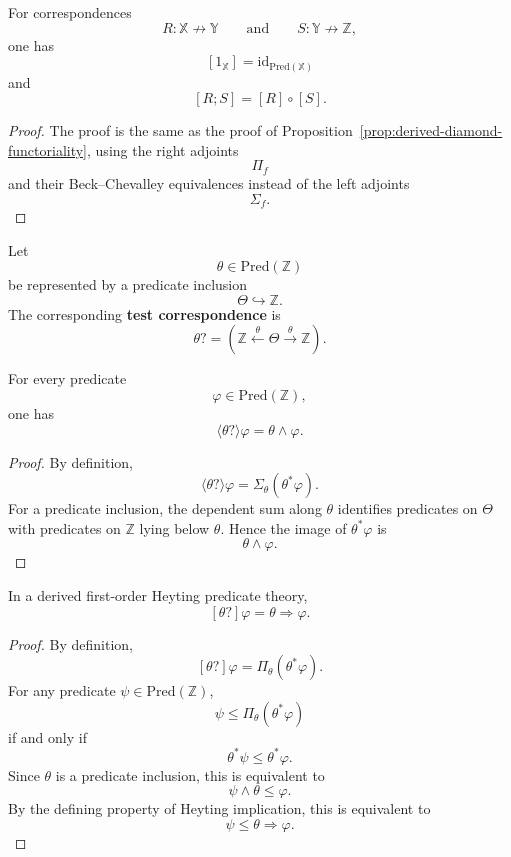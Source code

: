 \begin{proposition}
\label{prop:derived-box-functoriality}
For correspondences
\[
R:\mathbb X\nrightarrow\mathbb Y
\qquad
\text{and}
\qquad
S:\mathbb Y\nrightarrow\mathbb Z,
\]
one has
\[
[1_{\mathbb X}]=\mathrm{id}_{\mathrm{Pred}(\mathbb X)}
\]
and
\[
[R;S]=[R]\circ[S].
\]
\end{proposition}

\begin{proof}
The proof is the same as the proof of
Proposition~\ref{prop:derived-diamond-functoriality}, using the right
adjoints
\[
\Pi_f
\]
and their Beck--Chevalley equivalences instead of the left adjoints
\[
\Sigma_f.
\]
\end{proof}

\begin{definition}
\label{def:derived-test}
Let
\[
\theta\in\mathrm{Pred}(\mathbb Z)
\]
be represented by a predicate inclusion
\[
\Theta\hookrightarrow\mathbb Z.
\]
The corresponding \textbf{test correspondence} is
\[
\theta?
=
\left(
\mathbb Z
\xleftarrow{\theta}
\Theta
\xrightarrow{\theta}
\mathbb Z
\right).
\]
\end{definition}

\begin{proposition}
\label{prop:derived-test-diamond-law}
For every predicate
\[
\varphi\in\mathrm{Pred}(\mathbb Z),
\]
one has
\[
\langle\theta?\rangle\varphi
=
\theta\wedge\varphi.
\]
\end{proposition}

\begin{proof}
By definition,
\[
\langle\theta?\rangle\varphi
=
\Sigma_\theta(\theta^\ast\varphi).
\]
For a predicate inclusion, the dependent sum along \(\theta\) identifies
predicates on \(\Theta\) with predicates on \(\mathbb Z\) lying below
\(\theta\). Hence the image of \(\theta^\ast\varphi\) is
\[
\theta\wedge\varphi.
\]
\end{proof}

\begin{proposition}
\label{prop:derived-test-box-law}
In a derived first-order Heyting predicate theory,
\[
[\theta?]\varphi
=
\theta\Rightarrow\varphi.
\]
\end{proposition}

\begin{proof}
By definition,
\[
[\theta?]\varphi
=
\Pi_\theta(\theta^\ast\varphi).
\]
For any predicate \(\psi\in\mathrm{Pred}(\mathbb Z)\),
\[
\psi\le \Pi_\theta(\theta^\ast\varphi)
\]
if and only if
\[
\theta^\ast\psi\le \theta^\ast\varphi.
\]
Since \(\theta\) is a predicate inclusion, this is equivalent to
\[
\psi\wedge\theta\le \varphi.
\]
By the defining property of Heyting implication, this is equivalent to
\[
\psi\le \theta\Rightarrow\varphi.
\]
\end{proof}

